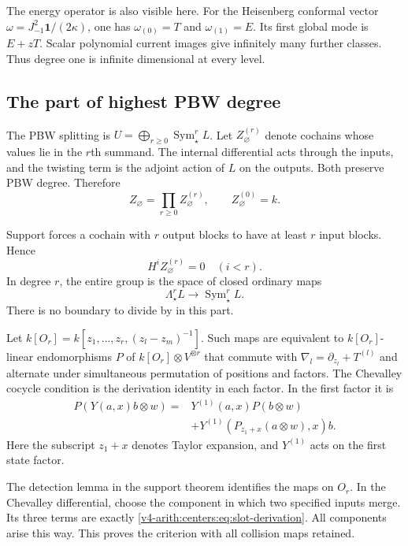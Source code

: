 The energy operator is
also visible here.
For the Heisenberg
conformal vector
$\omega=J_{-1}^2\mathbf1/(2\kappa)$,
one has $\omega_{(0)}=T$
and $\omega_{(1)}=E$.
Its first global mode is
$E+zT$. Scalar polynomial
current images give
infinitely many further
classes. Thus degree one
is infinite dimensional
at every level.

\subsection{The part of highest PBW degree}
\label{v4-arith:centers:subsec:top-degree}

The PBW splitting is
$U=\bigoplus_{r\geq0}\operatorname{Sym}^r_\star L$.
Let $Z_\varnothing^{(r)}$
denote cochains whose
values lie in the
$r$th summand.
The internal differential
acts through the inputs,
and the twisting term
is the adjoint action
of $L$ on the outputs.
Both preserve PBW degree.
Therefore
\[
 Z_\varnothing=\prod_{r\geq0}Z_\varnothing^{(r)},
 \qquad Z_\varnothing^{(0)}=k.
\]

Support forces a cochain
with $r$ output blocks
to have at least $r$
input blocks. Hence
\[
 H^iZ_\varnothing^{(r)}=0\quad(i<r).
\]
In degree $r$, the
entire group is the
space of closed ordinary
maps
\[
 \Lambda^r_\star L
 \longrightarrow\operatorname{Sym}^r_\star L.
\]
There is no boundary
to divide by in this
part.

Let
$k[O_r]=k[z_1,\ldots,z_r,
(z_l-z_m)^{-1}]$.
Such maps are equivalent
to $k[O_r]$-linear
endomorphisms $P$ of
$k[O_r]\otimes V^{\otimes r}$
that commute with
$\nabla_l=\partial_{z_l}+T^{(l)}$
and alternate under
simultaneous permutation
of positions and factors.
The Chevalley cocycle
condition is the
derivation identity
in each factor. In
the first factor it is
\begin{equation}\label{v4-arith:centers:eq:slot-derivation}
 \begin{split}
 P(Y(a,x)b\otimes w)
 ={}&Y^{(1)}(a,x)P(b\otimes w)\\
 &+Y^{(1)}(P_{z_1+x}(a\otimes w),x)b .
 \end{split}
\end{equation}
Here the subscript
$z_1+x$ denotes Taylor
expansion, and $Y^{(1)}$
acts on the first
state factor.

The detection lemma
in the support theorem
identifies the maps on
$O_r$. In the Chevalley
differential, choose the
component in which two
specified inputs merge.
Its three terms are
exactly
\eqref{v4-arith:centers:eq:slot-derivation}.
All components arise
this way. This proves
the criterion with all
collision maps retained.

